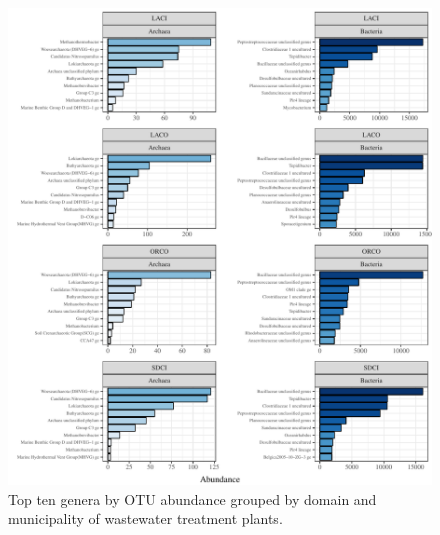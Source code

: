 \documentclass[letterpaper,12pt]{article}\usepackage[]{graphicx}\usepackage[]{color}
\newenvironment{knitrout}{}{} %
\begin{document}
\begin{knitrout}
\color{fgcolor}\begin{figure}[!ht]

{\centering \includegraphics[width=\textwidth]{figs/abundwwtp} 

}

\caption[Top ten genera by OTU abundance grouped by domain and municipality of wastewater treatment plants]{Top ten genera by OTU abundance grouped by domain and municipality of wastewater treatment plants.}\label{fig:abundwwtp}
\end{figure}


\end{knitrout}
\clearpage
\end{document}
